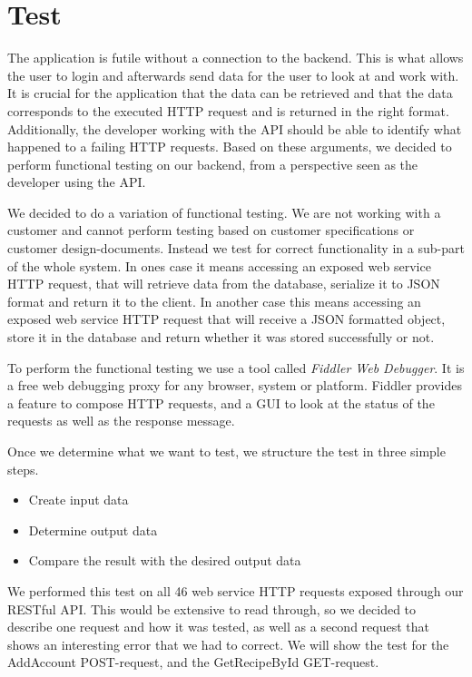 \chapter{Test}
\label{chap:test}

The application is futile without a connection to the backend. This is what allows the user to login and afterwards send data for the user to look at and work with. It is crucial for the application that the data can be retrieved and that the data corresponds to the executed HTTP request and is returned in the right format. Additionally, the developer working with the API should be able to identify what happened to a failing HTTP requests. Based on these arguments, we decided to perform functional testing on our backend, from a perspective seen as the developer using the API. 

We decided to do a variation of functional testing. We are not working with a customer and cannot perform testing based on customer specifications or customer design-documents. Instead we test for correct functionality in a sub-part of the whole system. In ones case it means accessing an exposed web service HTTP request, that will retrieve data from the database, serialize it to JSON format and return it to the client. In another case this means accessing an exposed web service HTTP request that will receive a JSON formatted object, store it in the database and return whether it was stored successfully or not.

To perform the functional testing we use a tool called \textit{Fiddler Web Debugger}. It is a free web debugging proxy for any browser, system or platform\cite{fiddler}. Fiddler provides a feature to compose HTTP requests, and a GUI to look at the status of the requests as well as the response message. 

Once we determine what we want to test, we structure the test in three simple steps.
\begin{itemize}
\item Create input data
\item Determine output data
\item Compare the result with the desired output data
\end{itemize}

We performed this test on all 46 web service HTTP requests exposed through our RESTful API. This would be extensive to read through, so we decided to describe one request and how it was tested, as well as a second request that shows an interesting error that we had to correct. We will show the test for the AddAccount POST-request, and the GetRecipeById GET-request.

